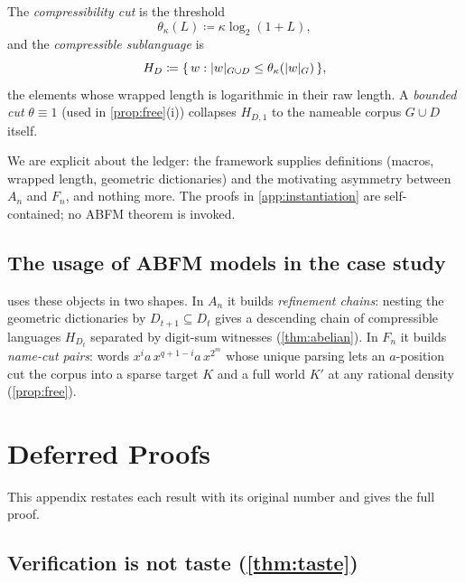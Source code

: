 \documentclass[11pt]{article}
\numberwithin{equation}{section}
\newcommand{\defeq}{\coloneqq}
\DeclarePairedDelimiter{\abs}{\lvert}{\rvert}
\DeclarePairedDelimiter{\set}{\{}{\}}
\newcommand{\Comp}[1]{H_{#1}}
\theoremstyle{plain}
\theoremstyle{definition}
\theoremstyle{remark}
\begin{document}
The \emph{compressibility cut} is the threshold
\begin{equation}\label{eq:bg-cut}
  \theta_\kappa(L) \defeq \kappa \log_2(1 + L),
\end{equation}
and the \emph{compressible sublanguage} is
\begin{equation}\label{eq:bg-comp}
  \Comp{D} \defeq \set*{\, w : \abs{w}_{G \cup D} \le \theta_\kappa(\abs{w}_G) \,},
\end{equation}
the elements whose wrapped length is logarithmic in their raw length. A \emph{bounded cut}
$\theta \equiv 1$ (used in \cref{prop:free}(i)) collapses $\Comp{D, 1}$ to the nameable corpus
$G \cup D$ itself.

We are explicit about the ledger: the framework supplies definitions (macros, wrapped length,
geometric dictionaries) and the motivating asymmetry between $A_n$ and $F_n$, and nothing
more. The proofs in \cref{app:instantiation} are self-contained; no ABFM theorem is invoked.

\subsection{The usage of ABFM models in the case study}
\label{app:bg-guide}

 uses these objects in two shapes. In $A_n$ it builds
\emph{refinement chains}: nesting the geometric dictionaries by $D_{t+1} \subseteq D_t$ gives
a descending chain of compressible languages $\Comp{D_t}$ separated by digit-sum witnesses
(\cref{thm:abelian}). In $F_n$ it builds \emph{name-cut pairs}: words $x^i a\, x^{q+1-i} a\,
x^{2^m}$ whose unique parsing lets an $a$-position cut the corpus into a sparse target $K$ and
a full world $K'$ at any rational density (\cref{prop:free}).

\section{Deferred Proofs}
\label{app:proofs}

This appendix restates each result with its original number and gives the full proof.

\subsection{Verification is not taste (\texorpdfstring{\cref{thm:taste}}{Theorem 1})}
\label{app:taste}
\end{document}
